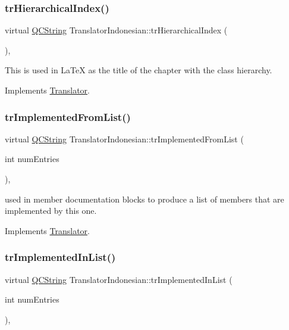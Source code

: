 \subsubsection{\texorpdfstring{trHierarchicalIndex()}{trHierarchicalIndex()}}
{\footnotesize\ttfamily virtual \mbox{\hyperlink{class_q_c_string}{Q\+C\+String}} Translator\+Indonesian\+::tr\+Hierarchical\+Index (\begin{DoxyParamCaption}{ }\end{DoxyParamCaption})\hspace{0.3cm}{\ttfamily [inline]}, {\ttfamily [virtual]}}

This is used in La\+TeX as the title of the chapter with the class hierarchy. 

Implements \mbox{\hyperlink{class_translator}{Translator}}.

\mbox{\label{class_translator_indonesian_ab7d294f3dae9f3a210a495f76178dc80}} 
\subsubsection{\texorpdfstring{trImplementedFromList()}{trImplementedFromList()}}
{\footnotesize\ttfamily virtual \mbox{\hyperlink{class_q_c_string}{Q\+C\+String}} Translator\+Indonesian\+::tr\+Implemented\+From\+List (\begin{DoxyParamCaption}\item[{int}]{num\+Entries }\end{DoxyParamCaption})\hspace{0.3cm}{\ttfamily [inline]}, {\ttfamily [virtual]}}

used in member documentation blocks to produce a list of members that are implemented by this one. 

Implements \mbox{\hyperlink{class_translator}{Translator}}.

\mbox{\label{class_translator_indonesian_a90efe5f5bf9ae8bd1c0a36fd49b0aa21}} 
\subsubsection{\texorpdfstring{trImplementedInList()}{trImplementedInList()}}
{\footnotesize\ttfamily virtual \mbox{\hyperlink{class_q_c_string}{Q\+C\+String}} Translator\+Indonesian\+::tr\+Implemented\+In\+List (\begin{DoxyParamCaption}\item[{int}]{num\+Entries }\end{DoxyParamCaption})\hspace{0.3cm}{\ttfamily [inline]}, {\ttfamily [virtual]}}

